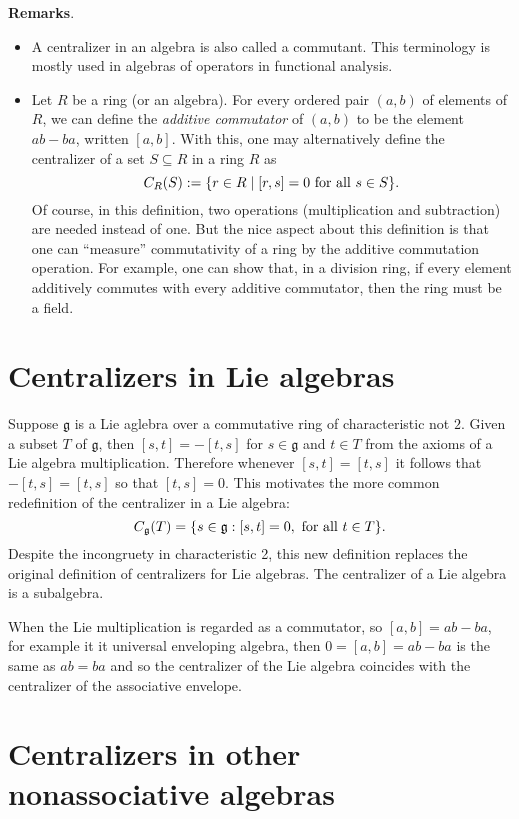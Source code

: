 \documentclass[12pt]{article}
\begin{document}
\textbf{Remarks}.  
\begin{itemize}
\item
A centralizer in an algebra is also called a commutant.  This terminology is mostly used in algebras of operators in functional analysis.
\item
Let $R$ be a ring (or an algebra).  For every ordered pair $(a,b)$ of elements of $R$, we can define the \emph{additive commutator} of $(a,b)$ to be the element $ab-ba$, written $[a,b]$.  With this, one may alternatively define the centralizer of a set $S\subseteq R$ in a ring $R$ as $$C_R(S):=\{ r\in R\mid [r,s]=0 \textnormal{ for all }s\in S \}.$$  Of course, in this definition, two operations (multiplication and subtraction) are needed instead of one.  But the nice aspect about this definition is that one can ``measure'' commutativity of a ring by the additive commutation operation.  For example, one can show that, in a division ring, if every element additively commutes with every additive commutator, then the ring must be a field.
\end{itemize}

\section{Centralizers in Lie algebras}

Suppose $\mathfrak{g}$ is a Lie aglebra over a commutative ring of characteristic not $2$.
Given a subset $T$ of $\mathfrak{g}$, then $[s,t]=-[t,s]$ for $s\in \mathfrak{g}$ and $t\in T$ from the axioms
of a Lie algebra multiplication.  Therefore whenever $[s,t]=[t,s]$ it follows that
$-[t,s]=[t,s]$ so that $[t,s]=0$.  This motivates the more common redefinition of 
the centralizer in a Lie algebra:
\begin{equation*}
   C_{\mathfrak{g}}(T)=\{ s\in \mathfrak{g} : [s,t]=0, \textnormal{ for all } t\in T\}.
\end{equation*}
Despite the incongruety in characteristic 2, this new definition replaces the original
definition of centralizers for Lie algebras.  The centralizer of a Lie algebra is a subalgebra.

When the Lie multiplication is regarded as a commutator, so $[a,b]=ab-ba$, for example
it it universal enveloping algebra, then $0=[a,b]=ab-ba$ is the same as $ab=ba$ and so
the centralizer of the Lie algebra coincides with the centralizer of the associative 
envelope.


\section{Centralizers in other nonassociative algebras}
\end{document}
